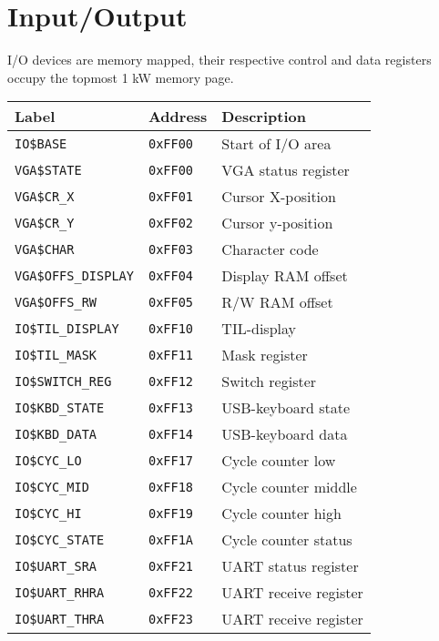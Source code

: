 \documentclass{leaflet}
\begin{document}
 \section{Input/Output}
  I/O devices are memory mapped, their respective control and data registers 
  occupy the topmost 1 kW memory page.
  \vspace*{-3mm}
  {\scriptsize
   \begin{center}
    \begin{longtable}{|l|l|l|}
     \hline
     Label&Address&Description\\
     \hline
     \hline
     \texttt{IO\$BASE}&\texttt{0xFF00}&Start of I/O area\\
     \hline
     \texttt{VGA\$STATE}&\texttt{0xFF00}&VGA status register\\
     \texttt{VGA\$CR\_X}&\texttt{0xFF01}&Cursor X-position\\
     \texttt{VGA\$CR\_Y}&\texttt{0xFF02}&Cursor y-position\\
     \texttt{VGA\$CHAR}&\texttt{0xFF03}&Character code\\
     \texttt{VGA\$OFFS\_DISPLAY}&\texttt{0xFF04}&Display RAM offset\\
     \texttt{VGA\$OFFS\_RW}&\texttt{0xFF05}&R/W RAM offset\\
     \hline
     \texttt{IO\$TIL\_DISPLAY}&\texttt{0xFF10}&TIL-display\\
     \texttt{IO\$TIL\_MASK}&\texttt{0xFF11}&Mask register\\
     \hline
     \texttt{IO\$SWITCH\_REG}&\texttt{0xFF12}&Switch register\\
     \hline
     \texttt{IO\$KBD\_STATE}&\texttt{0xFF13}&USB-keyboard state\\
     \texttt{IO\$KBD\_DATA}&\texttt{0xFF14}&USB-keyboard data\\
     \hline
     \texttt{IO\$CYC\_LO}&\texttt{0xFF17}&Cycle counter low\\
     \texttt{IO\$CYC\_MID}&\texttt{0xFF18}&Cycle counter middle\\
     \texttt{IO\$CYC\_HI}&\texttt{0xFF19}&Cycle counter high\\
     \texttt{IO\$CYC\_STATE}&\texttt{0xFF1A}&Cycle counter status\\
     \hline
     \texttt{IO\$UART\_SRA}&\texttt{0xFF21}&UART status register\\
     \texttt{IO\$UART\_RHRA}&\texttt{0xFF22}&UART receive register\\
     \texttt{IO\$UART\_THRA}&\texttt{0xFF23}&UART receive register\\
     \hline
    \end{longtable}
   \end{center}
  }
%
\end{document}

